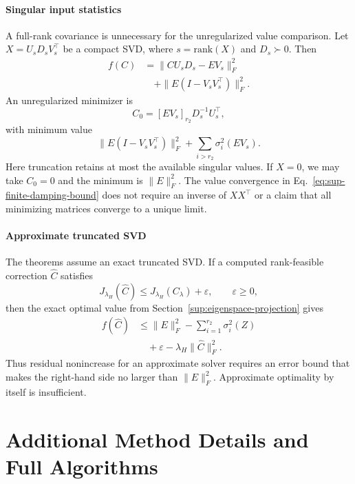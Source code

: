 \paragraph{Singular input statistics}
A full-rank covariance is unnecessary for the unregularized value comparison. Let $X=U_sD_sV_s^\top$ be a compact SVD, where $s=\mathrm{rank}(X)$ and $D_s\succ0$. Then
\begin{equation}
\begin{aligned}
f(C)
&=\|CU_sD_s-EV_s\|_F^2 \\
&\quad+\|E(I-V_sV_s^\top)\|_F^2.
\end{aligned}
\end{equation}
An unregularized minimizer is
\begin{equation}
C_0=[EV_s]_{r_2}D_s^{-1}U_s^\top,
\end{equation}
with minimum value
\begin{equation}
\|E(I-V_sV_s^\top)\|_F^2+\sum_{i>r_2}\sigma_i^2(EV_s).
\end{equation}
Here truncation retains at most the available singular values. If $X=0$, we may take $C_0=0$ and the minimum is $\|E\|_F^2$. The value convergence in Eq.~\eqref{eq:sup-finite-damping-bound} does not require an inverse of $XX^\top$ or a claim that all minimizing matrices converge to a unique limit.

\paragraph{Approximate truncated SVD}
The theorems assume an exact truncated SVD. If a computed rank-feasible correction $\widehat C$ satisfies
\begin{equation}
J_{\lambda_H}(\widehat C)
\le J_{\lambda_H}(C_\lambda)+\varepsilon,
\qquad\varepsilon\ge0,
\end{equation}
then the exact optimal value from Section~\ref{sup:eigenspace-projection} gives
\begin{equation}
\begin{aligned}
f(\widehat C)
&\le\|E\|_F^2-\sum_{i=1}^{r_2}\sigma_i^2(Z) \\
&\quad+\varepsilon-\lambda_H\|\widehat C\|_F^2.
\end{aligned}
\end{equation}
Thus residual nonincrease for an approximate solver requires an error bound that makes the right-hand side no larger than $\|E\|_F^2$. Approximate optimality by itself is insufficient.

\section{Additional Method Details and Full Algorithms}\label{app:algorithms}

